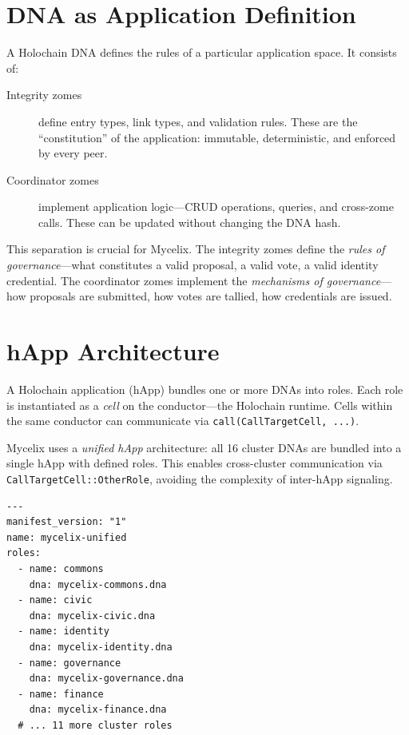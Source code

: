 \documentclass[12pt]{book}
\begin{document}
\section{DNA as Application Definition}

A Holochain DNA defines the rules of a particular application space. It consists of:

\begin{description}
  \item[Integrity zomes] define entry types, link types, and validation rules.
    These are the ``constitution'' of the application: immutable, deterministic,
    and enforced by every peer.
  \item[Coordinator zomes] implement application logic---CRUD operations, queries,
    and cross-zome calls. These can be updated without changing the DNA hash.
\end{description}

This separation is crucial for Mycelix. The integrity zomes define the
\emph{rules of governance}---what constitutes a valid proposal, a valid vote,
a valid identity credential. The coordinator zomes implement the
\emph{mechanisms of governance}---how proposals are submitted, how votes are
tallied, how credentials are issued.

\section{hApp Architecture}

A Holochain application (hApp) bundles one or more DNAs into roles. Each role
is instantiated as a \emph{cell} on the conductor---the Holochain runtime.
Cells within the same conductor can communicate via \texttt{call(CallTargetCell, ...)}.

Mycelix uses a \emph{unified hApp} architecture: all 16 cluster DNAs are
bundled into a single hApp with defined roles. This enables cross-cluster
communication via \texttt{CallTargetCell::OtherRole}, avoiding the complexity
of inter-hApp signaling.

\begin{lstlisting}[caption={Unified hApp manifest (simplified)},language={}]
---
manifest_version: "1"
name: mycelix-unified
roles:
  - name: commons
    dna: mycelix-commons.dna
  - name: civic
    dna: mycelix-civic.dna
  - name: identity
    dna: mycelix-identity.dna
  - name: governance
    dna: mycelix-governance.dna
  - name: finance
    dna: mycelix-finance.dna
  # ... 11 more cluster roles
\end{lstlisting}
\end{document}
